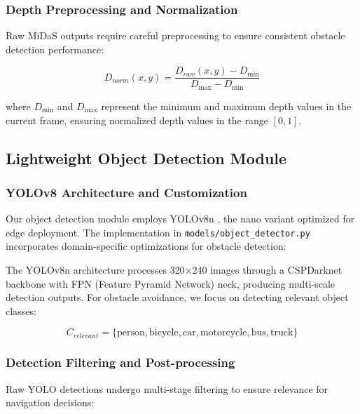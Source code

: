 \documentclass[12pt,oneside]{book}
\begin{document}
\subsubsection{Depth Preprocessing and Normalization}

Raw MiDaS outputs require careful preprocessing to ensure consistent obstacle detection performance:

\begin{equation}
D_{norm}(x,y) = \frac{D_{raw}(x,y) - D_{\min}}{D_{\max} - D_{\min}}
\label{eq:depth_normalization}
\end{equation}

where $D_{\min}$ and $D_{\max}$ represent the minimum and maximum depth values in the current frame, ensuring normalized depth values in the range $[0,1]$.

\subsection{Lightweight Object Detection Module}

\subsubsection{YOLOv8 Architecture and Customization}

Our object detection module employs YOLOv8n \cite{jocher2023ultralytics}, the nano variant optimized for edge deployment. The implementation in \texttt{models/object\_detector.py} incorporates domain-specific optimizations for obstacle detection:

The YOLOv8n architecture processes 320$\times$240 images through a CSPDarknet backbone with FPN (Feature Pyramid Network) neck, producing multi-scale detection outputs. For obstacle avoidance, we focus on detecting relevant object classes:

\begin{equation}
C_{relevant} = \{\text{person}, \text{bicycle}, \text{car}, \text{motorcycle}, \text{bus}, \text{truck}\}
\label{eq:relevant_classes}
\end{equation}

\subsubsection{Detection Filtering and Post-processing}

Raw YOLO detections undergo multi-stage filtering to ensure relevance for navigation decisions:
\end{document}
